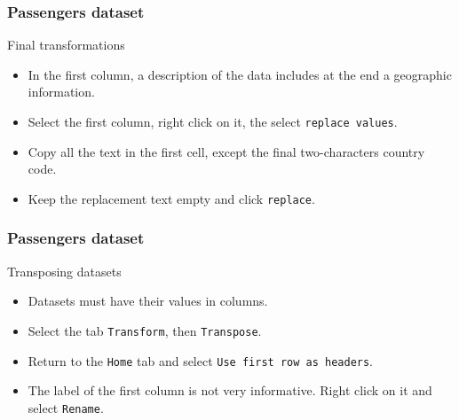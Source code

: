 \documentclass[main.tex]{subfiles}
\begin{document}
\begin{frame}
    \frametitle{Passengers dataset}
    \begin{block}{Final transformations}
        \begin{itemize}
            \item<+-> In the first column, a description of the data includes at the end a geographic information. 
            \item<+-> Select the first column, right click on it, the select \texttt{replace values}.
            \item<+-> Copy all the text in the first cell, except the final two-characters country code.
            \item<+-> Keep the replacement text empty and click \texttt{replace}. 
        \end{itemize}
    \end{block}
   
    
\end{frame}
\begin{frame}
    \frametitle{Passengers dataset}
    \begin{block}{Transposing datasets}
        \begin{itemize}
            \item<+-> Datasets must have their values in columns.
            \item<+-> Select the tab \texttt{Transform}, then \texttt{Transpose}.
            \item<+-> Return to the \texttt{Home} tab and select \texttt{Use first row as headers}.
            \item<+-> The label of the first column is not very informative. Right click 
            on it and select \texttt{Rename}.
        \end{itemize}
    \end{block}

\end{frame}
\end{document}
